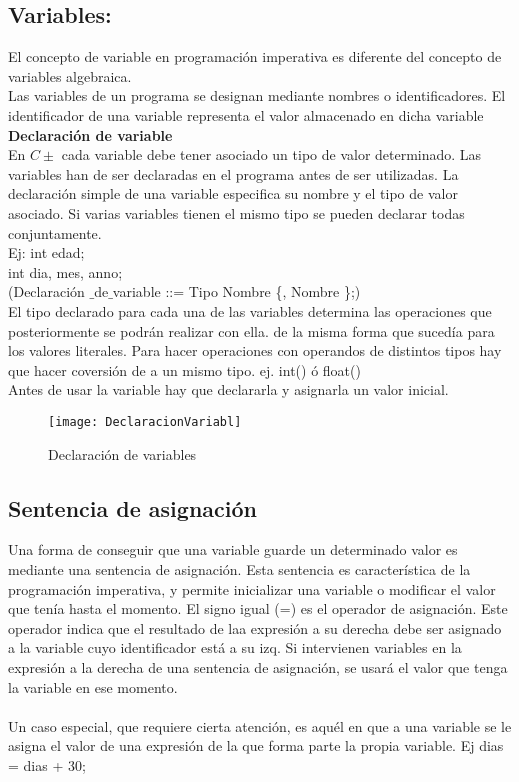 \documentclass[11pt,a4paper]{article}
\begin{document}
 \subsection{Variables:}
 El concepto de variable en programación imperativa es diferente del concepto 
 de variables algebraica. \\
 Las variables de un programa se designan mediante nombres o identificadores. 
 El identificador de una variable representa el valor almacenado en dicha variable
 \\
 \textbf{Declaración de variable}
 \\
 En $C\pm$ cada variable debe tener asociado un tipo de valor determinado. Las variables han de ser declaradas en el programa antes de ser utilizadas. 
 La declaración simple de una variable especifica su nombre y el tipo de valor 
 asociado. Si varias variables tienen el mismo tipo se pueden declarar todas conjuntamente.\\
 Ej: int edad;\\
 int dia, mes, anno;\\
 (Declaración $\_$de$\_$variable
  ::= Tipo Nombre \{, Nombre \};)\\
  El tipo declarado para cada una de las 
  variables determina las operaciones que posteriormente se podrán realizar con 
  ella. de la misma forma que sucedía para los valores literales. Para hacer operaciones con operandos de distintos tipos hay que hacer coversión de a un mismo tipo. ej. int() ó float()\\
  Antes de usar la variable hay que declararla y asignarla un valor inicial.
   \begin{figure}[htb]
  	\centering
  	\texttt{[image: DeclaracionVariabl]}
  	\caption{Declaración de variables}
  	\label{fig:Declaración variable}
  \end{figure}
  
   \subsection{Sentencia de asignación}
  Una forma de conseguir que una variable guarde un determinado valor es 
  mediante una sentencia de asignación. Esta sentencia es característica de 
  la programación imperativa, y permite inicializar una variable o modificar el 
  valor que tenía hasta el momento.
  El signo igual (=) es el operador de asignación. Este operador indica que el resultado de laa expresión a su derecha debe ser asignado a la variable cuyo identificador está a su izq. Si intervienen variables en la expresión a la derecha de una sentencia de asignación, se usará el valor que tenga la variable en ese momento.\\
 \\
 Un caso especial, que requiere cierta atención, es aquél en que a una variable 
 se le asigna el valor de una expresión de la que forma parte la propia variable. Ej dias = dias + 30;
\end{document}
